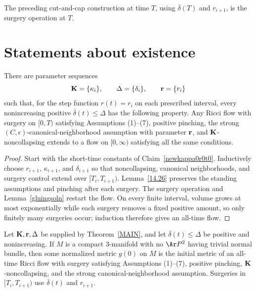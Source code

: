\begin{definition}
\label{def:surgery-operation}
The preceding cut-and-cap construction at time $T$, using
$\overline\delta(T)$ and $r_{i+1}$, is the surgery operation at $T$.
\end{definition}

\section{Statements about existence}

\begin{theorem}
\label{thm:main-existence-ricci-flow-surgery}
\label{MAIN}
There are parameter sequences
\[
  {\bf K}=\{\kappa_i\},\qquad
  \Delta=\{\delta_i\},\qquad
  {\bf r}=\{r_i\}
\]
such that, for the step function $r(t)=r_i$ on each prescribed interval, every
nonincreasing positive $\overline\delta(t)\leq\Delta$ has the following
property. Any Ricci flow with surgery on $[0,T)$ satisfying Assumptions
(1)--(7), positive pinching, the strong $(C,\epsilon)$-canonical-neighborhood
assumption with parameter ${\bf r}$, and ${\bf K}$-noncollapsing extends to a
flow on $[0,\infty)$ satisfying all the same conditions.
\end{theorem}

\begin{proof}
\sketch
Start with the short-time constants of Claim~\ref{newkappa0r0t0}. Inductively
choose $r_{i+1}$, $\kappa_{i+1}$, and $\delta_{i+1}$ so that noncollapsing,
canonical neighborhoods, and surgery control extend over
$[T_i,T_{i+1})$. Lemma~\ref{14.26} preserves the standing assumptions and
pinching after each surgery. The surgery operation and
Lemma~\ref{gluingsoln} restart the flow. On every finite interval, volume grows
at most exponentially while each surgery removes a fixed positive amount, so
only finitely many surgeries occur; induction therefore gives an all-time
flow.
\end{proof}

\begin{corollary}
\label{cor:ricci-flow-surgery-exists-all-time}
\label{RFSexists}
Let ${\bf K},{\bf r},\Delta$ be supplied by Theorem~\ref{MAIN}, and let
$\overline\delta(t)\leq\Delta$ be positive and nonincreasing. If $M$ is a
compact $3$-manifold with no $\Ar P^2$ having trivial normal bundle, then some
normalized metric $g(0)$ on $M$ is the initial metric of an all-time Ricci flow
with surgery satisfying Assumptions (1)--(7), positive pinching,
${\bf K}$-noncollapsing, and the strong canonical-neighborhood assumption.
Surgeries in $[T_i,T_{i+1})$ use $\overline\delta(t)$ and $r_{i+1}$.
\end{corollary}

